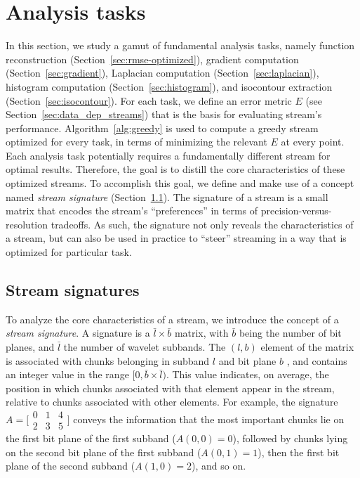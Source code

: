 \section{Analysis tasks}
\label{sec:analysis-tasks}

In this section, we study a gamut of fundamental analysis tasks, namely function reconstruction
(Section~\ref{sec:rmse-optimized}), gradient computation (Section~\ref{sec:gradient}), Laplacian
computation (Section~\ref{sec:laplacian}), histogram computation (Section~\ref{sec:histogram}), and
isocontour extraction (Section~\ref{sec:isocontour}). For each task, we define an error metric $E$
(see Section~\ref{sec:data_dep_streams}) that is the basis for evaluating stream's performance.
Algorithm~\ref{alg:greedy} is used to compute a greedy stream optimized for every task, in
terms of minimizing the relevant $E$ at every point. Each analysis task potentially requires a
fundamentally different stream for optimal results. Therefore, the goal is to distill the core
characteristics of these optimized streams. To accomplish this goal, we define and make use of a
concept named \emph{stream signature} (Section~\ref{sec:stream-signature}). The signature of a
stream is a small matrix that encodes the stream's ``preferences'' in terms of
precision-versus-resolution tradeoffs. As such, the signature not only reveals the characteristics
of a stream, but can also be used in practice to ``steer'' streaming in a way that is optimized for
particular task.

\subsection{Stream signatures}
\label{sec:stream-signature}

To analyze the core characteristics of a stream, we introduce the concept of a \emph{stream
signature}. A signature is a $\bar{l} \times \bar{b}$ matrix, with $\bar{b}$ being the number of bit
planes, and $\bar{l}$ the number of wavelet subbands. The $(l,b)$ element of the matrix is
associated with chunks belonging in subband $l$ and bit plane $b$ , and contains an integer value in
the range $[0,\bar{b}\times \bar{l})$. This value indicates, on average, the position in which
chunks associated with that element appear in the stream, relative to chunks associated with other
elements. For example, the signature  $A=\bigl[
\begin{smallmatrix}0 & 1 & 4\\ 2 & 3 & 5\end{smallmatrix}\bigr]$ conveys the information that the
most important chunks lie on the first bit plane of the first subband ($A(0,0)=0$), followed by
chunks lying on the second bit plane of the first subband ($A(0,1)=1$), then the first bit plane of
the second subband ($A(1,0)=2$), and so on.

